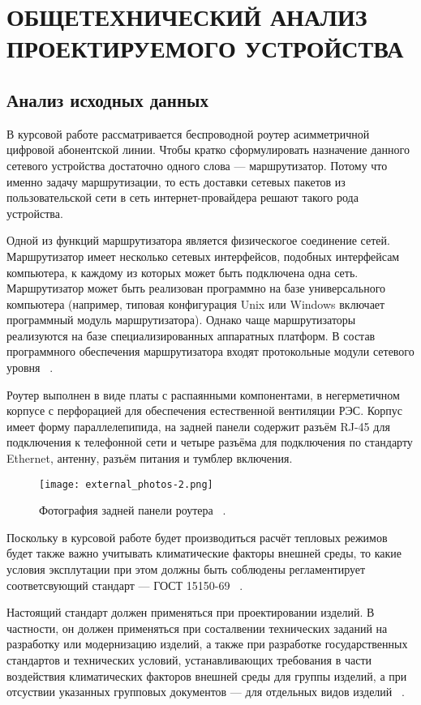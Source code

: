 \section{ОБЩЕТЕХНИЧЕСКИЙ АНАЛИЗ ПРОЕКТИРУЕМОГО УСТРОЙСТВА}
\subsection{Анализ исходных данных}
\par
В курсовой работе рассматривается беспроводной роутер асимметричной
цифровой абонентской линии.  Чтобы кратко сформулировать назначение
данного сетевого устройства достаточно одного слова — маршрутизатор.
Потому что именно задачу маршрутизации, то есть доставки сетевых
пакетов из пользовательской сети в сеть интернет-провайдера решают
такого рода устройства.
\par
Одной из функций маршрутизатора является физическогое соединение
сетей. Маршрутизатор имеет несколько сетевых интерфейсов, подобных
интерфейсам компьютера, к каждому из которых может быть подключена
одна сеть. Маршрутизатор может быть реализован программно на базе
универсального компьютера (например, типовая конфигурация Unix или
Windows включает программный модуль маршрутизатора). Однако чаще
маршрутизаторы реализуются на базе специализированных аппаратных
платформ. В состав программного обеспечения маршрутизатора входят
протокольные модули сетевого уровня ~\cite{NetworksOlifer2016}.

Роутер выполнен в виде платы с распаянными компонентами, в
негерметичном корпусе с перфорацией для обеспечения естественной
вентиляции РЭС. Корпус имеет форму параллелепипида, на задней панели
содержит разъём RJ-45 для подключения к телефонной сети и четыре
разъёма для подключения по стандарту Ethernet, антенну, разъём питания
и тумблер включения.

\begin{figure}[h] %
  \centering
\texttt{[image: external\_photos-2.png]}
\caption{Фотография задней панели роутера ~\cite{EXTERNAL_PHOTOS}.}

\end{figure}

Поскольку в курсовой работе будет производиться расчёт тепловых
режимов будет также важно учитывать климатические факторы внешней
среды, то какие условия эксплутации при этом должны быть соблюдены
регламентирует соответсвующий стандарт — ГОСТ 15150-69
~\cite{GOST_15150-69}.

Настоящий стандарт должен применяться при проектировании изделий.  В
частности, он должен применяться при состалвении технических заданий
на разработку или модернизацию изделий, а также при разработке
государственных стандартов и технических условий, устанавливающих
требования в части воздействия климатических факторов внешней среды
для группы изделий, а при отсуствии указанных групповых документов —
для отдельных видов изделий ~\cite{GOST_15150-69}.

